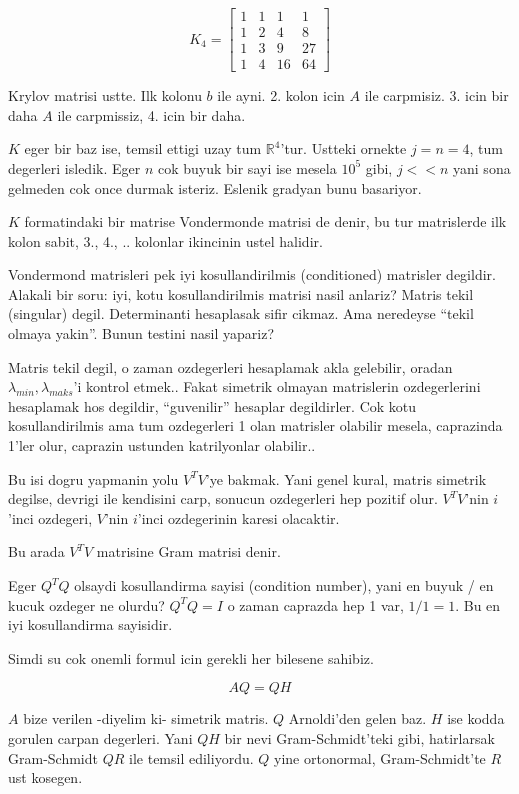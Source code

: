 \documentclass[12pt,fleqn]{article}\usepackage{../common}
\begin{document}
\[  
K_4 = 
\left[\begin{array}{rrrr}
1 & 1 & 1 & 1\\
1 & 2 & 4 & 8\\
1 & 3 & 9 & 27\\
1 & 4 & 16 & 64 
\end{array}\right]
\]

Krylov matrisi ustte. Ilk kolonu $b$ ile ayni. 2. kolon icin $A$ ile
carpmisiz. 3. icin bir daha $A$ ile carpmissiz, 4. icin bir daha. 

$K$ eger bir baz ise, temsil ettigi uzay tum $\mathbb{R}^4$'tur. Ustteki
ornekte $j = n = 4$, tum degerleri isledik. Eger $n$ cok buyuk bir sayi ise
mesela $10^5$ gibi, $j << n$ yani sona gelmeden cok once durmak
isteriz. Eslenik gradyan bunu basariyor. 

$K$ formatindaki bir matrise Vondermonde matrisi de denir, bu tur
matrislerde ilk kolon sabit, 3., 4., .. kolonlar ikincinin ustel 
halidir. 

Vondermond matrisleri pek iyi kosullandirilmis (conditioned) matrisler
degildir. Alakali bir soru: iyi, kotu kosullandirilmis matrisi nasil
anlariz? Matris tekil (singular) degil. Determinanti hesaplasak sifir
cikmaz. Ama neredeyse ``tekil olmaya yakin''. Bunun testini nasil yapariz? 

Matris tekil degil, o zaman ozdegerleri hesaplamak akla gelebilir,
oradan $\lambda_{min}, \lambda_{maks}$'i kontrol etmek.. Fakat simetrik
olmayan matrislerin ozdegerlerini hesaplamak hos degildir, ``guvenilir''
hesaplar degildirler. Cok kotu kosullandirilmis ama tum ozdegerleri 1 olan
matrisler olabilir mesela, caprazinda 1'ler olur, caprazin ustunden
katrilyonlar olabilir.. 

Bu isi dogru yapmanin yolu $V^TV$'ye bakmak. Yani genel kural, matris
simetrik degilse, devrigi ile kendisini carp, sonucun ozdegerleri hep
pozitif olur. $V^TV$'nin $i$'inci ozdegeri, $V$'nin $i$'inci ozdegerinin
karesi olacaktir. 

Bu arada $V^TV$ matrisine Gram matrisi denir. 

Eger $Q^TQ$ olsaydi kosullandirma sayisi (condition number), yani en buyuk /
en kucuk ozdeger ne olurdu? $Q^TQ = I$  o zaman caprazda hep 1 var, $1/1 =
1$. 
Bu en iyi kosullandirma sayisidir. 

Simdi su cok onemli formul icin gerekli her bilesene sahibiz. 

\[ AQ = QH \]

$A$ bize verilen -diyelim ki- simetrik matris. $Q$ Arnoldi'den gelen
baz. $H$ ise kodda gorulen carpan degerleri. Yani $QH$ bir nevi
Gram-Schmidt'teki gibi, hatirlarsak Gram-Schmidt $QR$ ile temsil
ediliyordu. $Q$ yine ortonormal, Gram-Schmidt'te $R$ ust kosegen. 
\end{document}
